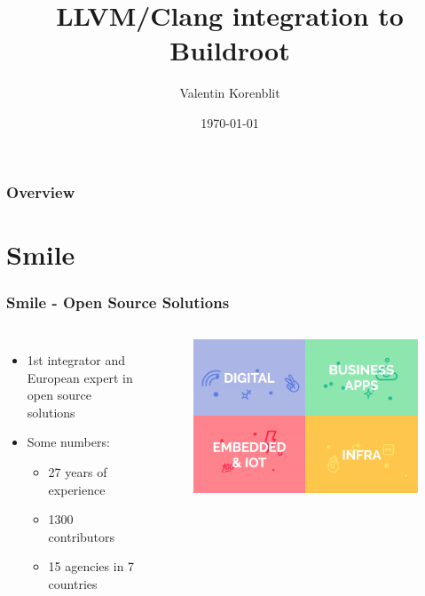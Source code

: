 \documentclass{smilebeamer}
\title[]{LLVM/Clang integration to Buildroot}
\author{Valentin Korenblit}
\institute[Smile]
{
Smile \\~\\
\medskip
\textit{valentin.korenblit@smile.fr}
}
\date{\today}
\begin{document}
\begin{frame}
\titlepage
\end{frame}

\begin{frame}
\frametitle{Overview}
\tableofcontents
\end{frame}

\section{Smile}

\begin{frame}
\frametitle{Smile - Open Source Solutions}
\begin{columns}[c]
\begin{itemize}
  \item 1st integrator and European expert in open source solutions
  \item Some numbers:
  \begin{itemize}
    \item 27 years of experience
    \item 1300 contributors
    \item 15 agencies in 7 countries
  \end{itemize}
\end{itemize}
\begin{figure}[H]
\centering
  \includegraphics[scale=0.25]{img/smile_offers.png}
\end{figure}
\end{columns}
\end{frame}
\end{document}
